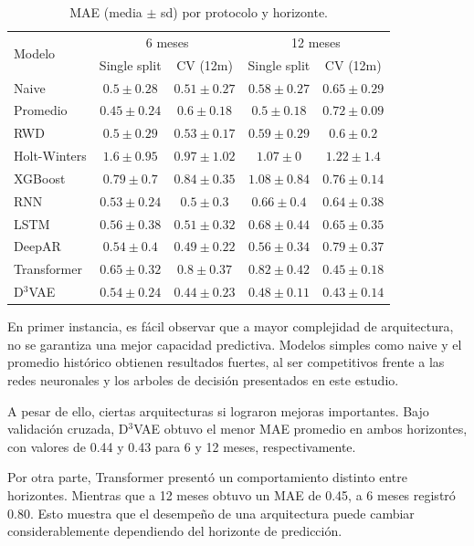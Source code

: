 \documentclass[12pt,letterpaper]{article}
\begin{document}
\begin{table}[H]
\centering
\caption{MAE (media \(\pm\) sd) por protocolo y horizonte.}
\label{tab:baseline_vs_cv}
\begin{tabular}{lcccc}
\toprule
\multirow{2}{*}{Modelo} & \multicolumn{2}{c}{6 meses} & \multicolumn{2}{c}{12 meses} \\
 & Single split & CV (12m) & Single split & CV (12m) \\
\midrule
Naive          & $0.5\pm0.28$ & $0.51\pm0.27$ & $0.58\pm0.27$ & $0.65\pm0.29$  \\
Promedio       & $0.45\pm0.24$ & $0.6\pm0.18$ & $0.5\pm0.18$ & $0.72\pm0.09$  \\
RWD            & $0.5\pm0.29$ & $0.53\pm0.17$ & $0.59\pm0.29$ & $0.6\pm0.2$ \\
Holt-Winters   & $1.6\pm0.95$ &  $0.97\pm1.02$  & $1.07\pm0$ & $1.22\pm1.4$ \\
XGBoost        & $0.79\pm0.7$ & $0.84\pm0.35$ & $1.08\pm 0.84$ & $0.76 \pm 0.14$ \\
RNN            & $0.53\pm0.24$ & $0.5 \pm 0.3$ & $0.66\pm0.4$ & $0.64\pm 0.38$  \\
LSTM           & $0.56\pm0.38$ & $0.51 \pm 0.32$ & $0.68\pm0.44$ & $0.65\pm0.35$  \\
DeepAR         & $0.54\pm0.4$ & $0.49 \pm 0.22$ & $0.56\pm0.34$ & $0.79\pm0.37$  \\
Transformer    & $0.65\pm0.32$ & $0.8 \pm 0.37$ & $0.82\pm0.42$ & $0.45\pm0.18$  \\
D$^3$VAE       & $0.54 \pm 0.24$ & $0.44 \pm 0.23$ & $0.48 \pm 0.11$ & $0.43 \pm 0.14$ \\
\bottomrule
\end{tabular}
\end{table}

En primer instancia, es fácil observar que a mayor complejidad de arquitectura, no se garantiza una mejor capacidad predictiva. Modelos simples como naive y el promedio histórico obtienen resultados fuertes, al ser competitivos frente a las redes neuronales y los arboles de decisión presentados en este estudio.

A pesar de ello, ciertas arquitecturas si lograron mejoras importantes. Bajo validación cruzada, D$^3$VAE obtuvo el menor MAE promedio en ambos horizontes, con valores de 0.44 y 0.43 para
6 y 12 meses, respectivamente.

Por otra parte, Transformer presentó un comportamiento distinto entre horizontes. Mientras que a 12 meses obtuvo un MAE de 0.45, a 6 meses registró 0.80. Esto muestra que el desempeño de una arquitectura puede cambiar considerablemente dependiendo del horizonte de predicción.
\end{document}
